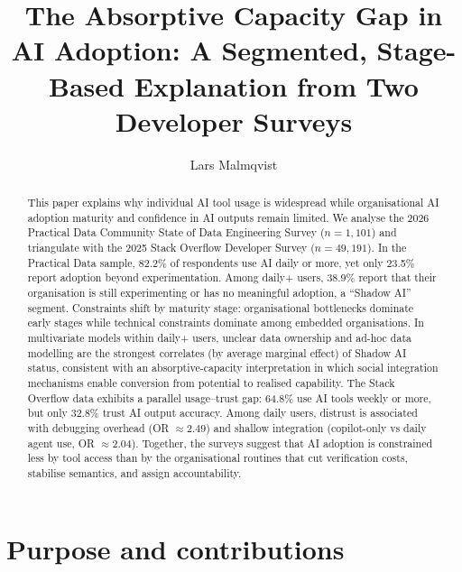 \documentclass[twocolumn]{article}
\begin{document}
\title{\textbf{The Absorptive Capacity Gap in AI Adoption: A Segmented, Stage-Based Explanation from Two Developer Surveys}}

\author[1]{Lars Malmqvist}
\date{}

\setcounter{Maxaffil}{0}
\renewcommand\Affilfont{\itshape\small}

\maketitle

\begin{abstract}
\noindent This paper explains why individual AI tool usage is widespread while organisational AI adoption maturity and confidence in AI outputs remain limited. We analyse the 2026 Practical Data Community State of Data Engineering Survey ($n{=}1{,}101$) and triangulate with the 2025 Stack Overflow Developer Survey ($n{=}49{,}191$). In the Practical Data sample, 82.2\% of respondents use AI daily or more, yet only 23.5\% report adoption beyond experimentation. Among daily+ users, 38.9\% report that their organisation is still experimenting or has no meaningful adoption, a ``Shadow AI'' segment. Constraints shift by maturity stage: organisational bottlenecks dominate early stages while technical constraints dominate among embedded organisations. In multivariate models within daily+ users, unclear data ownership and ad-hoc data modelling are the strongest correlates (by average marginal effect) of Shadow AI status, consistent with an absorptive-capacity interpretation in which social integration mechanisms enable conversion from potential to realised capability. The Stack Overflow data exhibits a parallel usage--trust gap: 64.8\% use AI tools weekly or more, but only 32.8\% trust AI output accuracy. Among daily users, distrust is associated with debugging overhead (OR $\approx 2.49$) and shallow integration (copilot-only vs daily agent use, OR $\approx 2.04$). Together, the surveys suggest that AI adoption is constrained less by tool access than by the organisational routines that cut verification costs, stabilise semantics, and assign accountability.
\end{abstract}


\section{Purpose and contributions}
\end{document}
